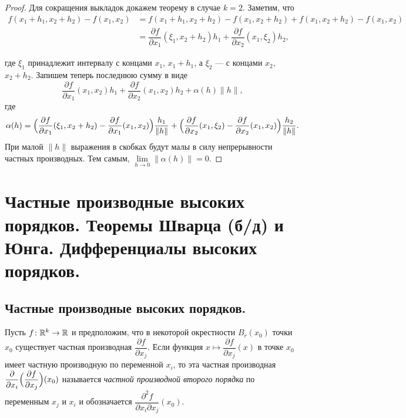\documentclass[a4paper]{article}
\theoremstyle{named}
\begin{document}
    \begin{proof}
        Для сокращения выкладок докажем теорему в случае $k=2$.
        Заметим, что
        \begin{align*}
            f(x_1+h_1,x_2+h_2) - f(x_1,x_2)
            &=f(x_1+h_1,x_2+h_2) - f(x_1,x_2+h_2) + f(x_1, x_2+h_2) - f(x_1,x_2) \\
            &=\dfrac{\partial f}{\partial x_1}(\xi_1, x_2+h_2)h_1 + \dfrac{\partial f}{\partial x_2}(x_1,\xi_2)h_2,
        \end{align*}

        где $\xi_1$ принадлежит интервалу с концами
        $x_1$, $x_1+h_1$, а $\xi_2$ --- с концами $x_2$, $x_2+h_2$.
        Запишем теперь последнюю сумму в виде
        $$
            \dfrac{\partial f}{\partial x_1}(x_1, x_2)h_1 + \dfrac{\partial f}{\partial x_2}(x_1,x_2)h_2 + \alpha(h)\|h\|,
        $$
        где
        $$
            \alpha(h) =
            \Bigl(\dfrac{\partial f}{\partial x_1}(\xi_1, x_2+h_2) - \dfrac{\partial f}{\partial x_1}(x_1, x_2)\Bigr)\dfrac{h_1}{\|h\|}
            +
            \Bigl(\dfrac{\partial f}{\partial x_2}(x_1,\xi_2) - \dfrac{\partial f}{\partial x_2}(x_1, x_2)\Bigr)\dfrac{h_2}{\|h\|}.
        $$
        При малой $\|h\|$ выражения в скобках будут малы в силу непрерывности частных производных.
        Тем самым, $\lim\limits_{h\to 0}\|\alpha(h)\| = 0$.
    \end{proof}

    \section{Частные производные высоких порядков. Теоремы Шварца (б/д) и Юнга. Дифференциалы высоких порядков.}

    \subsection{Частные производные высоких порядков.}

    \begin{definition*}
        Пусть $f\colon \mathbb{R}^k\to \mathbb{R}$ и предположим, что в некоторой окрестности $B_r(x_0)$ точки $x_0$ существует частная производная $\dfrac{\partial f}{\partial x_j}$. Если функция $x\mapsto \dfrac{\partial f}{\partial x_j}(x)$ в точке $x_0$ имеет частную производную по переменной $x_i$, то эта частная производная $\dfrac{\partial}{\partial x_i}\Bigl(\dfrac{\partial f}{\partial x_j}\Bigr) (x_0)$ называется {\it частной производной второго порядка} по переменным $x_j$ и $x_i$
        и обозначается $\dfrac{\partial^2 f}{\partial x_i\partial x_j}(x_0)$.
    \end{definition*}
\end{document}
